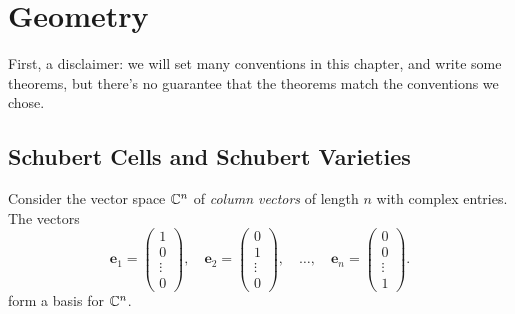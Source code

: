\chapter{Geometry}

First, a disclaimer:
we will set many conventions in this chapter,
and write some theorems,
but there's no guarantee that the theorems match the conventions we chose.

\section{Schubert Cells and Schubert Varieties}

Consider the vector space \(\mathbb{C}^n\) of \emph{column vectors} of length \(n\) with complex entries.
The vectors
\begin{equation}
    \mathbf{e}_1 = \begin{pmatrix} 1 \\ 0 \\ \vdots \\ 0 \end{pmatrix}, \quad
    \mathbf{e}_2 = \begin{pmatrix} 0 \\ 1 \\ \vdots \\ 0 \end{pmatrix}, \quad
    \ldots, \quad
    \mathbf{e}_n = \begin{pmatrix} 0 \\ 0 \\ \vdots \\ 1 \end{pmatrix}.
\end{equation}
form a basis for \(\mathbb{C}^n\).

